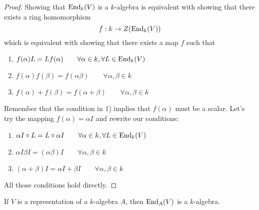 \begin{proof}
Showing that \(\operatorname{End}_{k}(V)\) is a \(k\)-algebra is equivalent with showing that there exists a ring homomorphism
\[
f: k \rightarrow  Z(\operatorname{End}_{k}(V))
\]
which is equivalent with showing that there exists a map \(f\) such that

\begin{enumerate}
  \item \(f(\alpha )L=Lf(\alpha ) \qquad \forall \alpha \in k,\forall L\in \operatorname{End}_{k}(V)\)
  \item \(f(\alpha )f(\beta )=f(\alpha \beta ) \qquad \forall \alpha ,\beta \in k\)
  \item \(f(\alpha )+f(\beta )=f(\alpha +\beta ) \qquad \forall \alpha ,\beta \in k\)
\end{enumerate}

Remember that the condition in 1) implies that \(f(\alpha )\) must be a scalar. Let's try the mapping \(f(\alpha )=\alpha I\) and rewrite our conditions:

\begin{enumerate}
  \item \(\alpha I\circ L=L\circ \alpha I \qquad \forall \alpha \in k,\forall L\in \operatorname{End}_{k}(V)\)
  \item \(\alpha I\beta I=(\alpha \beta )I \qquad \forall \alpha ,\beta \in k\)
  \item \((\alpha +\beta )I=\alpha I+\beta I \qquad \forall \alpha ,\beta \in k\)
\end{enumerate}

All those conditions hold directly.
\end{proof}

\begin{prop}
If \(V\) is a representation of a \(k\)-algebra \(A\), then \(\operatorname{End}_A(V)\) is a \(k\)-algebra.
\end{prop}

